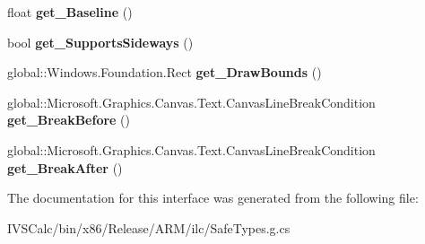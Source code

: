 \begin{DoxyCompactItemize}
float {\bfseries get\+\_\+\+Baseline} ()
\item 
\mbox{\label{interface_microsoft_1_1_graphics_1_1_canvas_1_1_text_1_1_i_canvas_text_inline_object_a3b2557805b6f07e4b21599ebae515270}} 
bool {\bfseries get\+\_\+\+Supports\+Sideways} ()
\item 
\mbox{\label{interface_microsoft_1_1_graphics_1_1_canvas_1_1_text_1_1_i_canvas_text_inline_object_a7e6302b6465f8d6f7772aa52547cefc2}} 
global\+::\+Windows.\+Foundation.\+Rect {\bfseries get\+\_\+\+Draw\+Bounds} ()
\item 
\mbox{\label{interface_microsoft_1_1_graphics_1_1_canvas_1_1_text_1_1_i_canvas_text_inline_object_ab4d7471230758ba37f78405c4601e84c}} 
global\+::\+Microsoft.\+Graphics.\+Canvas.\+Text.\+Canvas\+Line\+Break\+Condition {\bfseries get\+\_\+\+Break\+Before} ()
\item 
\mbox{\label{interface_microsoft_1_1_graphics_1_1_canvas_1_1_text_1_1_i_canvas_text_inline_object_a4448b603d3b5124efb75f573cbb18a73}} 
global\+::\+Microsoft.\+Graphics.\+Canvas.\+Text.\+Canvas\+Line\+Break\+Condition {\bfseries get\+\_\+\+Break\+After} ()
\end{DoxyCompactItemize}


The documentation for this interface was generated from the following file\+:\begin{DoxyCompactItemize}
\item 
I\+V\+S\+Calc/bin/x86/\+Release/\+A\+R\+M/ilc/Safe\+Types.\+g.\+cs\end{DoxyCompactItemize}
